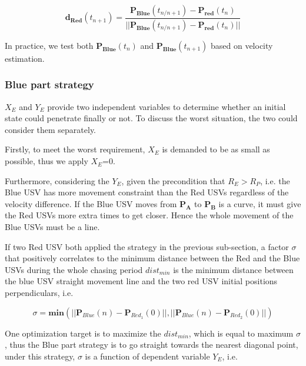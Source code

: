 \documentclass{mcmthesis}
\begin{document}
\begin{equation}
\mathbf{d_{Red}}(t_{n+1}) = \frac{\mathbf{P_{Blue}}(t_{n/n+1}) - \mathbf{P_{red}}(t_{n})}{\lvert \lvert \mathbf{P_{Blue}}(t_{n/n+1}) - \mathbf{P_{red}}(t_{n}) \lvert \lvert}
\end{equation}

In practice, we test both $\mathbf{P_{Blue}}(t_{n})$ and $\mathbf{P_{Blue}}(t_{n+1})$ based on velocity estimation.

\subsubsection{Blue part strategy}

$X_E$ and $Y_E$ provide two independent variables to determine whether an initial state could penetrate finally or not. To discuss the worst situation, the two could consider them separately. \par

Firstly, to meet the worst requirement, $X_E$ is demanded to be as small as possible, thus we apply $X_E$=0. \par

Furthermore, considering the $Y_E$, given the precondition that $R_E > R_P$, i.e. the Blue USV has more movement constraint than the Red USVs regardless of the velocity difference. If the Blue USV moves from $\mathbf{P_A}$ to $\mathbf{P_B}$ is a curve, it must give the Red USVs more extra times to get closer. Hence the whole movement of the Blue USVs must be a line. \par

If two Red USV both applied the strategy in the previous sub-section, a factor $\sigma$ that positively correlates to the minimum distance between the Red and the Blue USVs during the whole chasing period $dist_{min}$ is the minimum distance between the blue USV straight movement line and the two red USV initial positions perpendiculars, i.e.

\begin{equation}
\sigma = \mathbf{min}(\lvert \lvert \mathbf{P}_{Blue}(n) - \mathbf{P}_{Red_1}(0) \lvert \lvert, \lvert \lvert \mathbf{P}_{Blue}(n) - \mathbf{P}_{Red_2}(0) \lvert \lvert)
\end{equation}

One optimization target is to maximize the $dist_{min}$, which is equal to maximum $\sigma$, thus the Blue part strategy is to go straight towards the nearest diagonal point, under this strategy, $\sigma$ is a function of dependent variable $Y_E$, i.e.
\end{document}

